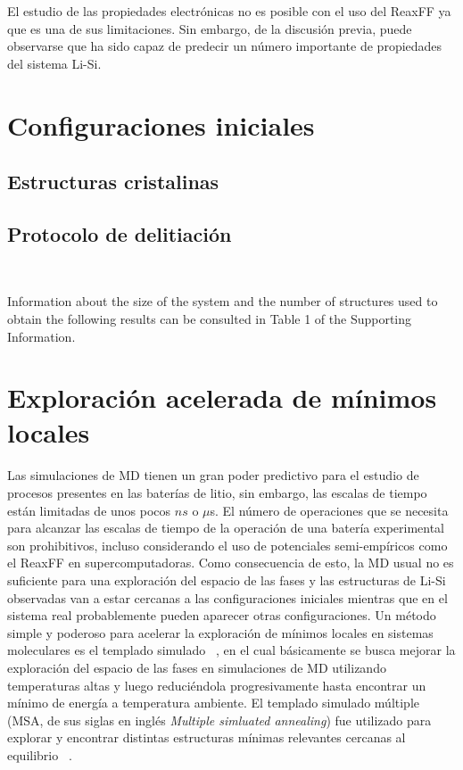 El estudio de las propiedades electrónicas no es posible con el uso del ReaxFF ya
que es una de sus limitaciones. Sin embargo, de la discusión previa, puede 
observarse que ha sido capaz de predecir un número importante de propiedades del 
sistema Li-Si.


\section{Configuraciones iniciales}

\subsection{Estructuras cristalinas}

\subsection{Protocolo de delitiación}

\

Information about the size of the system and the number of structures used to 
obtain the following results can be consulted in Table 1 of the Supporting 
Information.


\section{Exploración acelerada de mínimos locales}

Las simulaciones de MD tienen un gran poder predictivo para el estudio de 
procesos presentes en las baterías de litio, sin embargo, las escalas de tiempo
están limitadas de unos pocos $ns$ o $\mu$s. El número de operaciones que se 
necesita para alcanzar las escalas de tiempo de la operación de una batería 
experimental son prohibitivos, incluso considerando el uso de potenciales 
semi-empíricos como el ReaxFF en supercomputadoras. Como consecuencia de esto,
la MD usual no es suficiente para una exploración del espacio de las fases y las
estructuras de Li-Si observadas van a estar cercanas a las configuraciones 
iniciales mientras que en el sistema real probablemente pueden aparecer otras
configuraciones. Un método simple y poderoso para acelerar la exploración de 
mínimos locales en sistemas moleculares es el templado simulado 
~\cite{kirkpatrick1983}, en el cual básicamente se busca mejorar la exploración
del espacio de las fases en simulaciones de MD utilizando temperaturas altas y
luego reduciéndola progresivamente hasta encontrar un mínimo de energía a 
temperatura ambiente. El templado simulado múltiple (MSA, de sus siglas en inglés 
\textit{Multiple simluated annealing}) fue utilizado para explorar y encontrar
distintas estructuras mínimas relevantes cercanas al equilibrio ~\cite{hao2015}.

